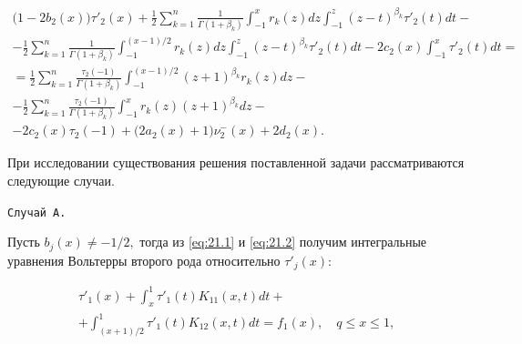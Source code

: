  \begin{multline}

\bigl(1 - 2{b_2}(x)\bigr){\tau '_2}(x) + \frac{1}{2}\sum\limits_{k = 1}^n {\frac{1}{{\Gamma (1 + {\beta

_k})}} \int _{ - 1}^x {{r_k}(z)dz \int _{ - 1}^z {{{(z - t)}^{{\beta _k}}}} {\tau '_2}(t)dt} }-

\\

- \frac{1}{2}\sum\limits_{k = 1}^n {\frac{1}{{\Gamma (1 + {\beta _k})}} \int _{ - 1}^{({{x - 1}})/{2}} {{r_k}(z)dz \int _{ - 1}^z {{{(z -

 t)}^{{\beta _k}}}} {\tau '_2}(t)dt}}- 2{c_2}(x) \int _{ - 1}^x {{\tau '_2}(t)} dt  =

\\ 

 = \frac{1}{2}\sum\limits_{k = 1}^n {\frac{{{\tau _2}( - 1)}}{{\Gamma (1 + {\beta _k})}} \int _{ - 1}^{({{x - 1}})/{2}} {{{(z + 1)}^{{\beta _k}}}{r_k}(z)dz} } - \hspace{3cm}

\\ 

  - \frac{1}{2}\sum\limits_{k = 1}^n {\frac{{{\tau _2}( - 1)}}{{\Gamma (1 + {\beta _k})}} \int _{ - 1}^x {{r_k}(z){{(z + 1)}^{{\beta _k}}}dz} } -

  \\

 -2{c_2}(x){\tau _2}( - 1) + \bigl(2{a_2}(x) + 1\bigr)\nu _2^ - (x) + 2{d_2}(x).\label{eq:21.2}

\end{multline}



\smallskip




При исследовании существования решения поставленной задачи рассматриваются следующие случаи.



\smallskip



\hypertarget{abd:A}{}



\texttt{Случай A.}

Пусть ${b_j}(x) \ne  - {1}/{2},$ тогда из \eqref{eq:21.1} и \eqref{eq:21.2} получим интегральные уравнения Вольтерры второго рода относительно ${\tau '_j}(x)$:

\begin{multline}

{\tau '_1}(x) +  \int _x^1 {\tau '_1}(t){K_{11}}(x,t)dt +  

\\

+ \int _{({{x + 1}})/{2}}^1 {{\tau '_1}(t){K_{12}}(x,t)dt}  = f_1(x), \quad  q \le x \le 1, \label{eq:22.1}

\end{multline}

